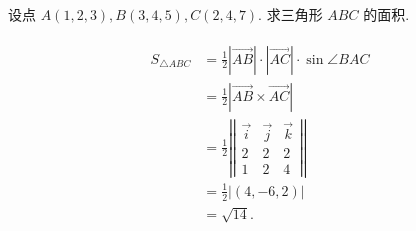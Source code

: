 \begin{example}
	设点 $A(1,2,3), B(3,4,5), C(2,4,7)$. 求三角形 $A B C$ 的面积.
\end{example}
\begin{solution}
	\begin{align*}
		\begin{aligned}
			S_{\triangle A B C} & = \frac{1}{2}|\overrightarrow{A B}| \cdot|\overrightarrow{A C}| \cdot \sin \angle B A C \\
			                    & =\frac{1}{2}|\overrightarrow{A B} \times \overrightarrow{A C}|                          \\
			                    & =\frac{1}{2}\left\lvert\left|\begin{array}{lll}
				                                                   \vec{i} & \vec{j} & \vec{k} \\
				                                                   2       & 2       & 2       \\
				                                                   1       & 2       & 4
			                                                   \end{array}\right| \right\rvert\,                          \\
			                    & =\frac{1}{2}|(4,-6,2)|                                                                  \\
			                    & =\sqrt{14} .
		\end{aligned}
	\end{align*}
\end{solution}

